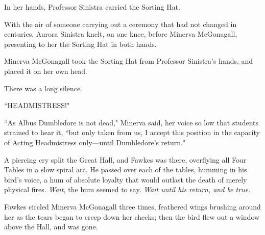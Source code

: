 In her hands, Professor Sinistra carried the Sorting Hat.

With the air of someone carrying out a ceremony that had not changed in centuries, Aurora Sinistra knelt, on one knee, before Minerva McGonagall, presenting to her the Sorting Hat in both hands.

Minerva McGonagall took the Sorting Hat from Professor Sinistra's hands, and placed it on her own head.

There was a long silence.

``HEADMISTRESS!"

``As Albus Dumbledore is not dead," Minerva said, her voice so low that students strained to hear it, ``but only taken from us, I accept this position in the capacity of Acting Headmistress only---until Dumbledore's return."

A piercing cry split the Great Hall, and Fawkes was there, overflying all Four Tables in a slow spiral arc. He passed over each of the tables, humming in his bird's voice, a hum of absolute loyalty that would outlast the death of merely physical fires. \emph{Wait,} the hum seemed to say. \emph{Wait until his return, and be true.}

Fawkes circled Minerva McGonagall three times, feathered wings brushing around her as the tears began to creep down her cheeks; then the bird flew out a window above the Hall, and was gone.

